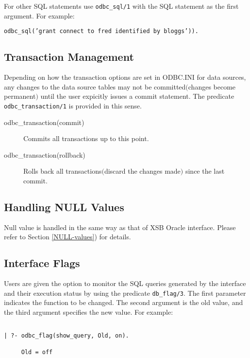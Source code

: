 For other SQL statements use {\tt odbc\_sql/1} with the SQL statement as the 
     first argument.  For example:
\begin{center}
{\tt odbc\_sql('grant connect to fred identified by bloggs')).}
\end{center}

\subsection{Transaction Management}\label{TransactionManagement}
Depending on how the transaction options are set in ODBC.INI for data sources, 
any changes to the data source tables may not be committed$($changes become 
permanent$)$  until the user expicitly issues a commit statement. 
The predicate {\tt odbc\_transaction/1} is provided in this sense. 
\begin{description}
\item[odbc\_transaction(commit)]
        Commits all transactions up to this point.
\item[odbc\_transaction(rollback)]
        Rolls back all transactions$($discard the changes made$)$  since 
the last commit.
\end{description}

\subsection{Handling NULL Values}
Null value is handled in the same way as that of XSB Oracle interface.
Please refer to Section \ref{NULL-values}) for details.

\subsection{Interface Flags}

Users are given the option to monitor the SQL queries generated 
by the interface and their execution status by using the 
predicate {\tt db\_flag/3}.  The first parameter indicates the function  to be
changed.  The second argument is the old value, and the third argument specifies
the new value.  For example:
\begin{verbatim}

| ?- odbc_flag(show_query, Old, on).

     Old = off
\end{verbatim}

